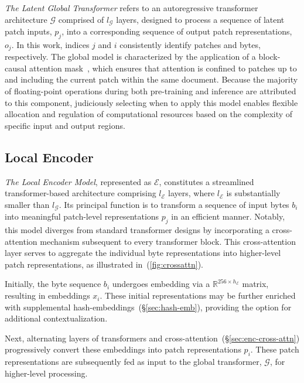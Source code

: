 \textit{The Latent Global Transformer} refers to an autoregressive transformer architecture $\mathcal{G}$ comprised of $l_{\mathcal{G}}$ layers, designed to process a sequence of latent patch inputs, $p_j$, into a corresponding sequence of output patch representations, $o_j$. In this work, indices $j$ and $i$ consistently identify patches and bytes, respectively. The global model is characterized by the application of a block-causal attention mask~\citep{dubey2024llama}, which ensures that attention is confined to patches up to and including the current patch within the same document. Because the majority of floating-point operations during both pre-training and inference are attributed to this component, judiciously selecting when to apply this model enables flexible allocation and regulation of computational resources based on the complexity of specific input and output regions.

\subsection{Local Encoder}
\label{section:local}

\textit{The Local Encoder Model}, represented as $\mathcal{E}$, constitutes a streamlined transformer-based architecture comprising $l_{\mathcal{E}}$ layers, where $l_{\mathcal{E}}$ is substantially smaller than $l_{\mathcal{G}}$. Its principal function is to transform a sequence of input bytes $b_i$ into meaningful patch-level representations $p_j$ in an efficient manner. Notably, this model diverges from standard transformer designs by incorporating a cross-attention mechanism subsequent to every transformer block. This cross-attention layer serves to aggregate the individual byte representations into higher-level patch representations, as illustrated in~(\autoref{fig:crossattn}).

Initially, the byte sequence $b_i$ undergoes embedding via a $\mathbb{R}^{256 \times h_{\mathcal{E}}}$ matrix, resulting in embeddings $x_i$. These initial representations may be further enriched with supplemental hash-embeddings~(\S\ref{sec:hash-emb}), providing the option for additional contextualization.

Next, alternating layers of transformers and cross-attention~(\S\ref{sec:enc-cross-attn}) progressively convert these embeddings into patch representations $p_i$. These patch representations are subsequently fed as input to the global transformer, $\mathcal{G}$, for higher-level processing.

